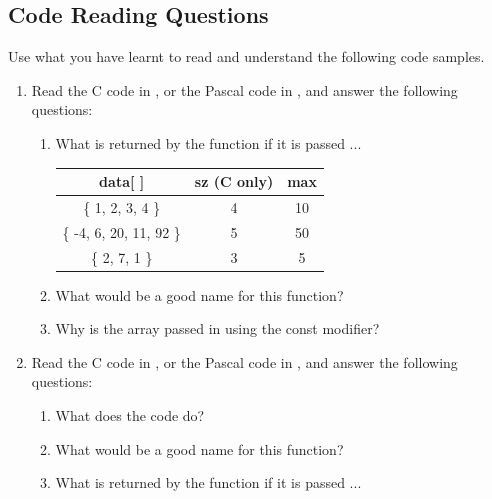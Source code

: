 \clearpage

\subsection{Code Reading Questions} %
\label{sub:code_reading_questions_array}

Use what you have learnt to read and understand the following code samples.
\begin{enumerate}
  \item Read the C code in , or the Pascal code in , and answer the following questions:
  \begin{enumerate}
    \item What is returned by the function if it is passed ... 
    
    \begin{table}[h]
      \centering
      \begin{tabular}{|c|c|c|}
      \hline
       \textbf{data[ ]} & \textbf{sz} (C only)  & \textbf{max}  \\
       \hline 
       \{ 1, 2, 3, 4 \} & 4 & 10 \\
       \hline
       \{ -4, 6, 20, 11, 92 \} & 5 & 50 \\
       \hline
       \{ 2, 7, 1 \} & 3 & 5 \\
       \hline
      \end{tabular}
    \end{table}
    \item What would be a good name for this function?
    \item Why is the array passed in using the const modifier?
  \end{enumerate}
  \begin{figure}[h]
  \end{figure}
  \begin{figure}[h]
  \end{figure}
  
  \clearpage
  \item Read the C code in , or the Pascal code in , and answer the following questions:
  \begin{enumerate}
    \item What does the code do?
    \item What would be a good name for this function?
    \item What is returned by the function if it is passed ... 
    

\end{enumerate}
\end{enumerate}
